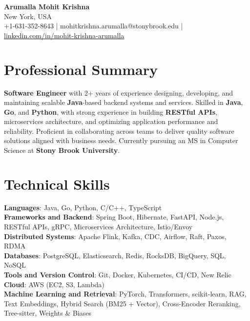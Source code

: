 \documentclass[letterpaper,11pt]{article}
\begin{document}
\begin{center}
  {\Large \textbf{Arumalla Mohit Krishna}} \\
  New York, USA \\
  +1-631-352-8643 \enspace | \enspace mohitkrishna.arumalla@stonybrook.edu \enspace | \enspace \href{https://www.linkedin.com/in/mohit-krishna-arumalla}{linkedin.com/in/mohit-krishna-arumalla}
\end{center}

\section{Professional Summary}
  \begin{itemize}[leftmargin=0.15in, label={}]
    \small{\item{
     \textbf{Software Engineer} with 2+ years of experience designing, developing, and maintaining scalable \textbf{Java}-based backend systems and services. Skilled in \textbf{Java}, \textbf{Go}, and \textbf{Python}, with strong experience in building \textbf{RESTful APIs}, microservices architecture, and optimizing application performance and reliability. Proficient in collaborating across teams to deliver quality software solutions aligned with business needs. Currently pursuing an MS in Computer Science at \textbf{Stony Brook University}.
    }}
  \end{itemize}
\vspace{-16pt}

\section{Technical Skills}
 \begin{itemize}[leftmargin=0.15in, label={}]
    \small{\item{
     \textbf{Languages}: Java, Go, Python, C/C++, TypeScript \\
     \textbf{Frameworks and Backend}: Spring Boot, Hibernate, FastAPI, Node.js, RESTful APIs, gRPC, Microservices Architecture, Istio/Envoy \\
     \textbf{Distributed Systems}: Apache Flink, Kafka, CDC, Airflow, Raft, Paxos, RDMA \\
     \textbf{Databases}: PostgreSQL, Elasticsearch, Redis, RocksDB, BigQuery, SQL, NoSQL \\
     \textbf{Tools and Version Control}: Git, Docker, Kubernetes, CI/CD, New Relic \\
     \textbf{Cloud}: AWS (EC2, S3, Lambda) \\
     \textbf{Machine Learning and Retrieval}: PyTorch, Transformers, scikit-learn, RAG, Text Embeddings, Hybrid Search (BM25 + Vector), Cross-Encoder Reranking, Tree-sitter, Weights \& Biases
    }}
 \end{itemize}
\vspace{-16pt}
\end{document}
